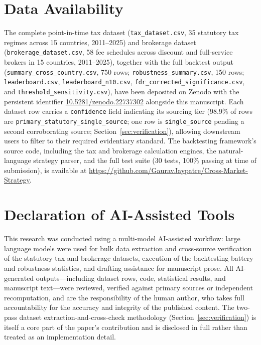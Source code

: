 \documentclass[11pt]{article}
\begin{document}
\section{Data Availability}
\label{sec:data}

The complete point-in-time tax dataset (\texttt{tax\_dataset.csv}, 35 statutory tax regimes across 15 countries, 2011--2025) and brokerage dataset (\texttt{brokerage\_dataset.csv}, 58 fee schedules across discount and full-service brokers in 15 countries, 2011--2025), together with the full backtest output (\texttt{summary\_cross\_country.csv}, 750 rows; \texttt{robustness\_summary.csv}, 150 rows; \texttt{leaderboard.csv}, \texttt{leaderboard\_n10.csv}, \texttt{fdr\_corrected\_significance.csv}, and \texttt{threshold\_sensitivity.csv}), have been deposited on Zenodo with the persistent identifier \href{https://doi.org/10.5281/zenodo.22737302}{10.5281/zenodo.22737302} alongside this manuscript. Each dataset row carries a \texttt{confidence} field indicating its sourcing tier (98.9\% of rows are \texttt{primary\_statutory\_single\_source}; one row is \texttt{single\_source} pending a second corroborating source; Section~\ref{sec:verification}), allowing downstream users to filter to their required evidentiary standard. The backtesting framework's source code, including the tax and brokerage calculation engines, the natural-language strategy parser, and the full test suite (30 tests, 100\% passing at time of submission), is available at \url{https://github.com/GauravJaypatre/Cross-Market-Strategy}.

\section*{Declaration of AI-Assisted Tools}

This research was conducted using a multi-model AI-assisted workflow: large language models were used for bulk data extraction and cross-source verification of the statutory tax and brokerage datasets, execution of the backtesting battery and robustness statistics, and drafting assistance for manuscript prose. All AI-generated outputs---including dataset rows, code, statistical results, and manuscript text---were reviewed, verified against primary sources or independent recomputation, and are the responsibility of the human author, who takes full accountability for the accuracy and integrity of the published content. The two-pass dataset extraction-and-cross-check methodology (Section~\ref{sec:verification}) is itself a core part of the paper's contribution and is disclosed in full rather than treated as an implementation detail.
\end{document}
